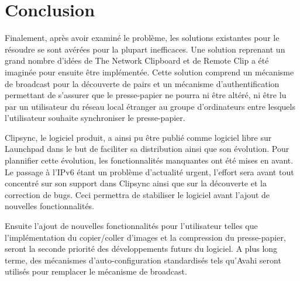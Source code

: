 \chapter*{Conclusion}
\renewcommand{\leftmark}{CONCLUSION}
Finalement, après avoir examiné le problème, les solutions existantes
pour le résoudre se sont avérées pour la plupart inefficaces. Une solution
reprenant un grand nombre d'idées de The Network Clipboard et de Remote
Clip a été imaginée pour ensuite être implémentée. Cette solution
comprend un mécanisme de broadcast pour la découverte de pairs et un mécanisme
d'authentification permettant de s'assurer que le presse-papier ne pourra ni
être altéré, ni être lu par un utilisateur du réseau local étranger au groupe
d'ordinateurs entre lesquels l'utilisateur souhaite synchroniser le
presse-papier.

Clipsync, le logiciel produit, a ainsi pu être publié comme logiciel libre sur
Launchpad dans le but de faciliter sa distribution ainsi que son évolution.
Pour plannifier cette évolution, les fonctionnalités manquantes ont été mises
en avant.
Le passage à l'IPv6 étant un problème d'actualité urgent, l'effort
sera avant tout concentré sur son support dans Clipsync ainsi que sur la
découverte et la correction de bugs. Ceci permettra de stabiliser le logiciel
avant l'ajout de nouvelles fonctionnalités.

Ensuite l'ajout de nouvelles fonctionnalités pour l'utilisateur telles que
l'implémentation du copier/coller d'images et la compression du presse-papier,
seront la seconde priorité des développements futurs du logiciel.
A plus long terme, des mécanismes d'auto-configuration
standardisés tels qu'Avahi seront utilisés pour remplacer le mécanisme
de broadcast.